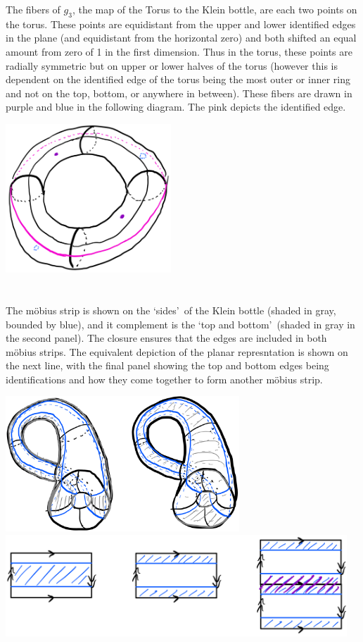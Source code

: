 \documentclass{jhwhw}
\begin{document}
\noindent
The fibers of $g_3$, the map of the Torus to the Klein bottle, are each two points on the torus. These points are equidistant from the upper and lower identified edges in the plane (and equidistant from the horizontal zero) and both shifted an equal amount from zero of 1 in the first dimension. Thus in the torus, these points are radially symmetric but on upper or lower halves of the torus (however this is dependent on the identified edge of the torus being the most outer or inner ring and not on the top, bottom, or anywhere in between). These fibers are drawn in purple and blue in the following diagram. The pink depicts the identified edge.
\begin{center}
	\includegraphics[height=2.2in]{5_4a2.png}
\end{center}

\part{}%
\noindent The m\"obius strip is shown on the \lq sides\rq\ of the Klein bottle (shaded in gray, bounded by blue), and it complement is the \lq top and bottom\rq\ (shaded in gray in the second panel). The closure ensures that the edges are included in both m\"obius strips. The equivalent depiction of the planar represntation is shown on the next line, with the final panel showing the top and bottom edges being identifications and how they come together to form another m\"obius strip.
\begin{center}
	\includegraphics[height=2in]{5_4b1.png}\\
	\vskip 1cm
	\includegraphics[height=1.5in]{5_4b2.png}
\end{center}
\end{document}
